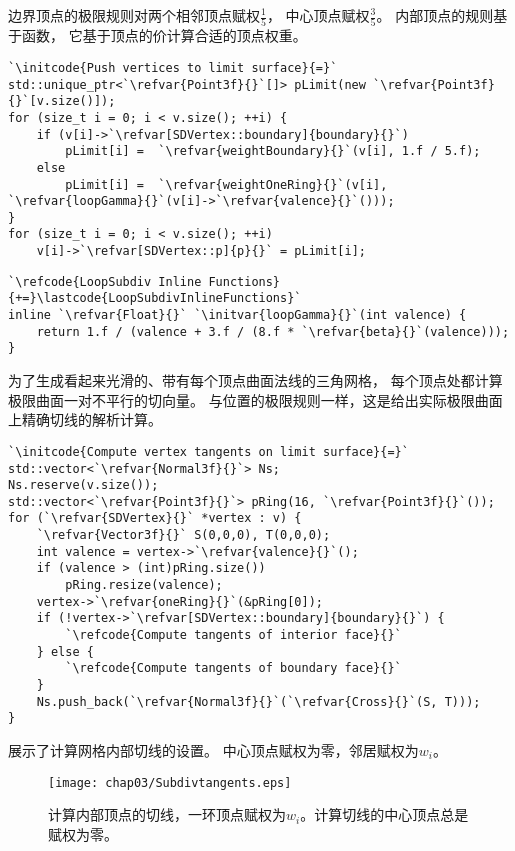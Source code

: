 边界顶点的极限规则对两个相邻顶点赋权$\displaystyle\frac{1}{5}$，
中心顶点赋权$\displaystyle\frac{3}{5}$。
内部顶点的规则基于函数，
它基于顶点的价计算合适的顶点权重。
\begin{lstlisting}
`\initcode{Push vertices to limit surface}{=}`
std::unique_ptr<`\refvar{Point3f}{}`[]> pLimit(new `\refvar{Point3f}{}`[v.size()]);
for (size_t i = 0; i < v.size(); ++i) {
    if (v[i]->`\refvar[SDVertex::boundary]{boundary}{}`)
        pLimit[i] =  `\refvar{weightBoundary}{}`(v[i], 1.f / 5.f);
    else
        pLimit[i] =  `\refvar{weightOneRing}{}`(v[i], `\refvar{loopGamma}{}`(v[i]->`\refvar{valence}{}`()));
}
for (size_t i = 0; i < v.size(); ++i)
    v[i]->`\refvar[SDVertex::p]{p}{}` = pLimit[i];
\end{lstlisting}
\begin{lstlisting}
`\refcode{LoopSubdiv Inline Functions}{+=}\lastcode{LoopSubdivInlineFunctions}`
inline `\refvar{Float}{}` `\initvar{loopGamma}{}`(int valence) {
    return 1.f / (valence + 3.f / (8.f * `\refvar{beta}{}`(valence)));
}
\end{lstlisting}

为了生成看起来光滑的、带有每个顶点曲面法线的三角网格，
每个顶点处都计算极限曲面一对不平行的切向量。
与位置的极限规则一样，这是给出实际极限曲面上精确切线的解析计算。
\begin{lstlisting}
`\initcode{Compute vertex tangents on limit surface}{=}`
std::vector<`\refvar{Normal3f}{}`> Ns;
Ns.reserve(v.size());
std::vector<`\refvar{Point3f}{}`> pRing(16, `\refvar{Point3f}{}`());
for (`\refvar{SDVertex}{}` *vertex : v) {
    `\refvar{Vector3f}{}` S(0,0,0), T(0,0,0);
    int valence = vertex->`\refvar{valence}{}`();
    if (valence > (int)pRing.size())
        pRing.resize(valence);
    vertex->`\refvar{oneRing}{}`(&pRing[0]);
    if (!vertex->`\refvar[SDVertex::boundary]{boundary}{}`) {
        `\refcode{Compute tangents of interior face}{}`
    } else {
        `\refcode{Compute tangents of boundary face}{}`
    }
    Ns.push_back(`\refvar{Normal3f}{}`(`\refvar{Cross}{}`(S, T)));
}
\end{lstlisting}

展示了计算网格内部切线的设置。
中心顶点赋权为零，邻居赋权为$w_i$。
\begin{figure}[htbp]
    \centering\texttt{[image: chap03/Subdivtangents.eps]}
    \caption{计算内部顶点的切线，一环顶点赋权为$w_i$。计算切线的中心顶点总是赋权为零。}
    \label{fig:3.37}
\end{figure}

